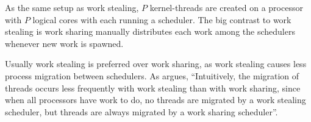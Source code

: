 As the same setup as work stealing, $P$ kernel\hyp{}threads are created on a processor with $P$ logical cores with each running a scheduler. The big contrast to work stealing is work sharing manually distributes each work among the schedulers whenever new work is spawned. 

Usually work stealing is preferred over work sharing, as work stealing causes less process migration between schedulers. As \citet[pp. 721]{blumofe1999scheduling} argues, ``Intuitively, the migration of threads occurs less frequently with work stealing than with work sharing, since when all processors have work to do, no threads are migrated by a work stealing scheduler, but threads are always migrated by a work sharing scheduler''.

